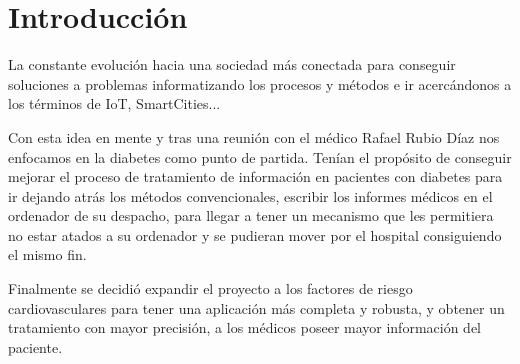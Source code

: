 \documentclass[11pt,spanish,
		listoftables,listoffigures]
		{tfgplantilla}
\begin{document}
\begin{abstract}[english]
The use of applications in mobile devices has been growing over the years, and is nowadays a fundamental tool in a wide range, from professionals such as communications, economics, commerce, health or destined to the leisure, travel , sports...

This application for Android is focused on the field of medicine, giving the solution to one of the current problems that existed in the Hospital Virgen de la Salud of Toledo through, an intuitive and simple interface, providing agility to the doctor in calculating the cardiovascular risk, while being complemented by conventional methods.

Intended to be managed by doctors, allowing them to store a patient's current data such as high blood pressure, cholesterol, diabetes, smoking and body mass index. In order to later obtain the cardiovascular risk of the same and facilitate an initial treatment to the doctor.
\end{abstract}

\mainmatter

\chapter{Introducci\'on}

La constante evolución hacia una sociedad más conectada para conseguir soluciones a problemas informatizando los procesos y métodos e ir acercándonos a los términos de IoT, SmartCities...

Con esta idea en mente y tras una reunión con el médico Rafael Rubio Díaz nos enfocamos en la diabetes como punto de partida. Tenían el propósito de conseguir mejorar el proceso de tratamiento de información en pacientes con diabetes para ir dejando atrás los métodos convencionales, escribir los informes médicos en el ordenador de su despacho, para llegar a tener un mecanismo que les permitiera no estar atados a su ordenador y se pudieran mover por el hospital consiguiendo el mismo fin. 

Finalmente se decidió expandir el proyecto a los factores de riesgo cardiovasculares para tener una aplicación más completa y robusta, y obtener un tratamiento con mayor precisión, a los médicos poseer mayor información del paciente.
\end{document}
